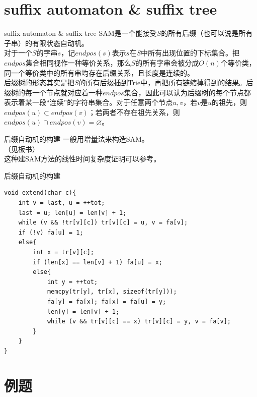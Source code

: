 \documentclass{beamer}
\begin{document}
\section{suffix automaton \& suffix tree}
\begin{frame}{suffix automaton \& suffix tree}
	SAM是一个能接受$S$的所有后缀（也可以说是所有子串）的有限状态自动机。\\
	
	对于一个$S$的字串$s$，记$endpos(s)$表示$s$在$S$中所有出现位置的下标集合。把$endpos$集合相同视作一种等价关系，那么$S$的所有字串会被分成$O(n)$个等价类，同一个等价类中的所有串均存在后缀关系，且长度是连续的。\\
	
	后缀树的形态其实是把$S$的所有后缀插到Trie中，再把所有链缩掉得到的结果。后缀树的每一个节点就对应着一种$endpos$集合，因此可以认为后缀树的每个节点都表示着某一段“连续”的字符串集合。对于任意两个节点$u, v$，若$v$是$u$的祖先，则$endpos(u) \subset endpos(v)$；若两者不存在祖先关系，则$endpos(u) \cap endpos(v) = \varnothing$。
\end{frame}
\begin{frame}{后缀自动机的构建}
	一般用增量法来构造SAM。\\
	
	（见板书）\\
	
	这种建SAM方法的线性时间复杂度证明可以参考\href{https://oi-wiki.org/string/sam/}{\color{red}{OI-Wiki}}。
\end{frame}

\begin{frame}[fragile]{后缀自动机的构建}
\begin{verbatim}
void extend(char c){
    int v = last, u = ++tot;
    last = u; len[u] = len[v] + 1;
    while (v && !tr[v][c]) tr[v][c] = u, v = fa[v];
    if (!v) fa[u] = 1;
    else{
        int x = tr[v][c];
        if (len[x] == len[v] + 1) fa[u] = x;
        else{
            int y = ++tot;
            memcpy(tr[y], tr[x], sizeof(tr[y]));
            fa[y] = fa[x]; fa[x] = fa[u] = y;
            len[y] = len[v] + 1;
            while (v && tr[v][c] == x) tr[v][c] = y, v = fa[v];
        }
    }
}
\end{verbatim}
	
\end{frame}
\section{例题}
\end{document}
